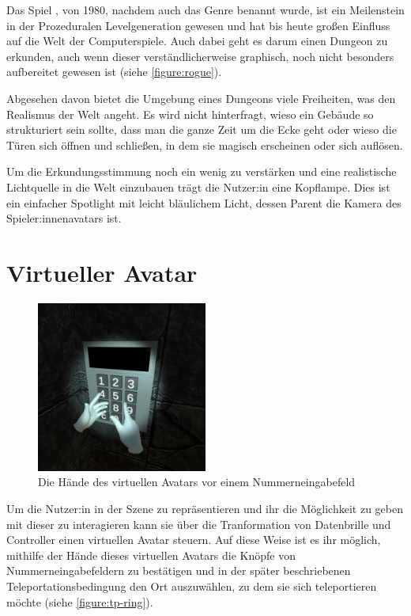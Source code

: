 Das Spiel , von 1980, nachdem auch das Genre  benannt wurde, ist ein Meilenstein in der Prozeduralen Levelgeneration gewesen und hat bis heute großen Einfluss auf die Welt der Computerspiele. Auch dabei geht es darum einen Dungeon zu erkunden, auch wenn dieser verständlicherweise graphisch, noch nicht besonders aufbereitet gewesen ist (siehe \autoref{figure:rogue}).

Abgesehen davon bietet die Umgebung eines Dungeons viele Freiheiten, was den Realismus der Welt angeht. Es wird nicht hinterfragt, wieso ein Gebäude so strukturiert sein sollte, dass man die ganze Zeit um die Ecke geht oder wieso die Türen sich öffnen und schließen, in dem sie magisch erscheinen oder sich auflösen.

Um die Erkundungsstimmung noch ein wenig zu verstärken und eine realistische Lichtquelle in die Welt einzubauen trägt die Nutzer:in eine Kopflampe. Dies ist ein einfacher Spotlight mit leicht bläulichem Licht, dessen Parent die Kamera des Spieler:innenavatars ist.


\section{Virtueller Avatar}

\begin{figure}[!h]
    \centering
    \includegraphics[width=0.5\textwidth]{vrscreenshots/hands.jpg}
    \caption{Die Hände des virtuellen Avatars vor einem Nummerneingabefeld}\label{figure:hands}
\end{figure}

Um die Nutzer:in in der Szene zu repräsentieren und ihr die Möglichkeit zu geben mit dieser zu interagieren kann sie über die Tranformation von Datenbrille und Controller einen virtuellen Avatar steuern. Auf diese Weise ist es ihr möglich, mithilfe der Hände dieses virtuellen Avatars die Knöpfe von Nummerneingabefeldern zu bestätigen und in der später beschriebenen Teleportationsbedingung den Ort auszuwählen, zu dem sie sich teleportieren möchte (siehe \autoref{figure:tp-ring}).

